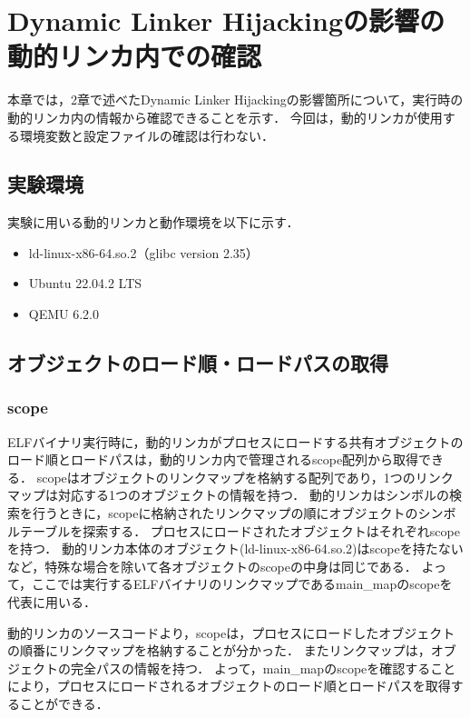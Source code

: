 \documentclass[submit,techreq,noauthor]{eco}	%
\begin{document}
\section{Dynamic Linker Hijackingの影響の動的リンカ内での確認}
本章では，2章で述べたDynamic Linker Hijackingの影響箇所について，実行時の動的リンカ内の情報から確認できることを示す．
今回は，動的リンカが使用する環境変数と設定ファイルの確認は行わない．

\subsection{実験環境}
実験に用いる動的リンカと動作環境を以下に示す．
\begin{itemize}
  \item ld-linux-x86-64.so.2（glibc version 2.35）
  \item Ubuntu 22.04.2 LTS
  \item QEMU 6.2.0  
 \end{itemize}

\subsection{オブジェクトのロード順・ロードパスの取得}
\subsubsection{scope}
ELFバイナリ実行時に，動的リンカがプロセスにロードする共有オブジェクトのロード順とロードパスは，動的リンカ内で管理されるscope配列から取得できる．
scopeはオブジェクトのリンクマップを格納する配列であり，1つのリンクマップは対応する1つのオブジェクトの情報を持つ．
動的リンカはシンボルの検索を行うときに，scopeに格納されたリンクマップの順にオブジェクトのシンボルテーブルを探索する．
プロセスにロードされたオブジェクトはそれぞれscopeを持つ．
動的リンカ本体のオブジェクト(ld-linux-x86-64.so.2)はscopeを持たないなど，特殊な場合を除いて各オブジェクトのscopeの中身は同じである．
よって，ここでは実行するELFバイナリのリンクマップであるmain\_mapのscopeを代表に用いる．

動的リンカのソースコードより，scopeは，プロセスにロードしたオブジェクトの順番にリンクマップを格納することが分かった．
またリンクマップは，オブジェクトの完全パスの情報を持つ．
よって，main\_mapのscopeを確認することにより，プロセスにロードされるオブジェクトのロード順とロードパスを取得することができる．\\
\end{document}
